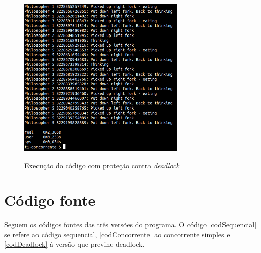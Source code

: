 \documentclass[conference]{IEEEtran}
\begin{document}
\begin{figure}[h!]
\caption{Execução do código com proteção contra \textit{deadlock}}
\centering
\includegraphics[width=8cm]{dea}
\label{fig:deadlock}
\end{figure}

\section{Código fonte}

Seguem os códigos fontes das três versões do programa.
O código \ref{codSequencial} se refere ao código sequencial, \ref{codConcorrente} ao concorrente simples e \ref{codDeadlock} à versão que previne deadlock.



\onecolumn






\end{document}
